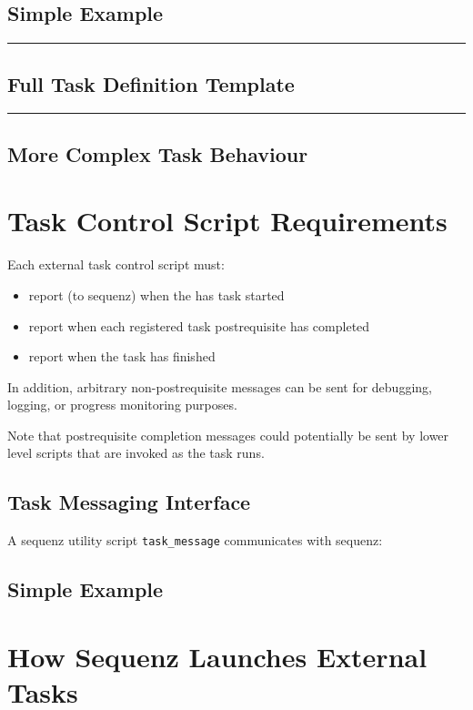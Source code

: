 \documentclass[11pt,a4paper]{article}
\begin{document}
\subsection{Simple Example}

\lstset{language=sh, numbers=left}

{\tiny
\noindent
\rule{5cm}{.2mm}

}

\subsection{Full Task Definition Template}

\lstset{language=sh, numbers=left}

{\tiny
\noindent
\rule{5cm}{.2mm}

}

\subsection{More Complex Task Behaviour}

\section{Task Control Script Requirements}

Each external task control script must:

\begin{itemize}
\item report (to sequenz) when the has task started
\item report when each registered task postrequisite has completed
\item report when the task has finished
\end{itemize}

In addition, arbitrary non-postrequisite messages can be sent for
debugging, logging, or progress monitoring purposes.

Note that postrequisite completion messages could potentially be 
sent by lower level scripts that are invoked as the task runs. 

\subsection{Task Messaging Interface}

A sequenz utility script \verb=task_message= communicates with sequenz:


\subsection{Simple Example}

\section{How Sequenz Launches External Tasks}
\end{document}
